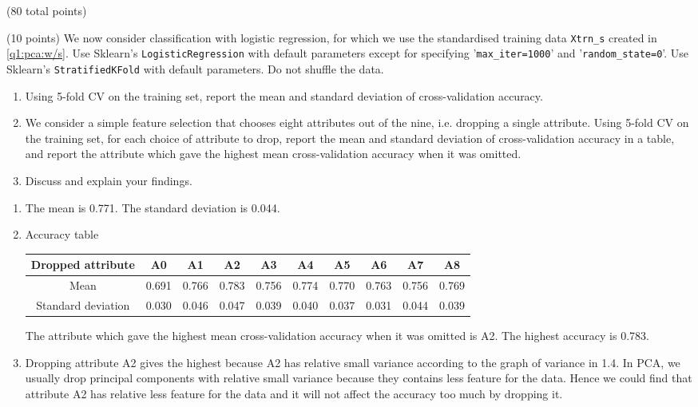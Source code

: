 \documentclass[12pt]{article}
\begin{document}
\begin{question}{(80 total points) \qOneTitle}
\begin{subquestion}{(10 points)
    We now consider classification with logistic regression, for which we use the standardised training data {\tt Xtrn\_s} created in \ref{q1:pca:w/s}.
    Use Sklearn's {\tt LogisticRegression} with default parameters except for specifying '{\tt max\_iter=1000}' and '{\tt random\_state=0}'.
    Use Sklearn's {\tt StratifiedKFold} with default parameters. Do not shuffle the data.
  } 
  \begin{enumerate}\NARROWITEM
  \item Using 5-fold CV on the training set, report the mean and standard deviation of cross-validation accuracy.
  \item We consider a simple feature selection that chooses eight attributes out of the nine, i.e. dropping a single attribute. Using 5-fold CV on the training set, for each choice of attribute to drop, report the mean and standard deviation of cross-validation accuracy in a table, and report the attribute which gave the highest mean cross-validation accuracy when it was omitted.
  \item Discuss and explain your findings.
  \end{enumerate}
   

  \begin{answerbox}{0.5\textheight}
    \begin{enumerate}
    \item The mean is 0.771. The standard deviation is 0.044.
    \item Accuracy table
        \begin{center}
        \begin{tabular}{c|c|c|c|c|c|c|c|c|c} \hline
             Dropped attribute&A0&A1&A2&A3&A4&A5&A6&A7&A8 \\ \hline
             Mean&0.691&0.766&0.783&0.756&0.774&0.770&0.763&0.756&0.769 \\ \hline
             Standard deviation&0.030&0.046&0.047&0.039&0.040&0.037&0.031&0.044&0.039 \\ \hline
        \end{tabular}
    \end{center}
    The attribute which gave the highest mean cross-validation accuracy when it was omitted is A2. The highest accuracy is 0.783.
    \item Dropping attribute A2 gives the highest because A2 has relative small variance according to the graph of variance in 1.4. In PCA, we usually drop principal components with relative small variance because they contains less feature for the data. Hence we could find that attribute A2 has relative less feature for the data and it will not affect the accuracy too much by dropping it. 
    \end{enumerate}
  \end{answerbox}
  


\end{subquestion}

\end{question}
\end{document}
